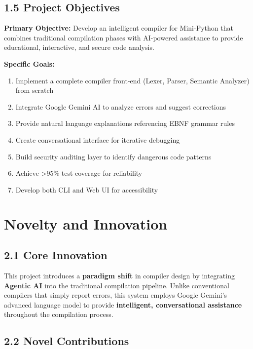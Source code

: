 \documentclass[a4paper,11pt]{article}
\begin{document}
\subsection{1.5 Project Objectives}

\textbf{Primary Objective:} Develop an intelligent compiler for Mini-Python that combines traditional compilation phases with AI-powered assistance to provide educational, interactive, and secure code analysis.

\textbf{Specific Goals:}
\begin{enumerate}
    \item Implement a complete compiler front-end (Lexer, Parser, Semantic Analyzer) from scratch
    \item Integrate Google Gemini AI to analyze errors and suggest corrections
    \item Provide natural language explanations referencing EBNF grammar rules
    \item Create conversational interface for iterative debugging
    \item Build security auditing layer to identify dangerous code patterns
    \item Achieve >95\% test coverage for reliability
    \item Develop both CLI and Web UI for accessibility
\end{enumerate}

\clearpage

\section{Novelty and Innovation}

\subsection{2.1 Core Innovation}

This project introduces a \textbf{paradigm shift} in compiler design by integrating \textbf{Agentic AI} into the traditional compilation pipeline. Unlike conventional compilers that simply report errors, this system employs Google Gemini's advanced language model to provide \textbf{intelligent, conversational assistance} throughout the compilation process.

\subsection{2.2 Novel Contributions}
\end{document}
